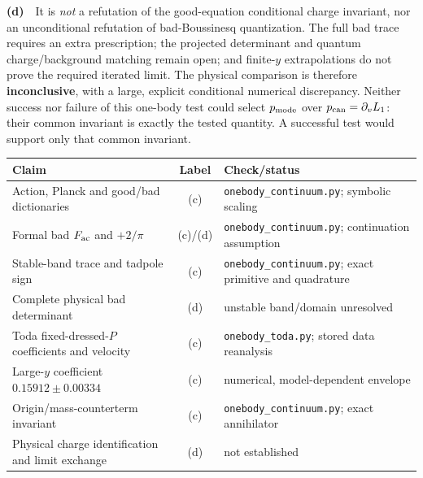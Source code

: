 \documentclass[11pt,a4paper]{article}
\newcommand{\Ld}{\textbf{(d)}\ }
\newcommand{\CC}{\texttt{onebody\_\allowbreak continuum.py}}
\newcommand{\TT}{\texttt{onebody\_\allowbreak toda.py}}
\begin{document}
\Ld\ It is \emph{not} a refutation of the good-equation conditional
charge invariant, nor an unconditional refutation of bad-Boussinesq
quantization. The full bad trace requires an extra prescription; the
projected determinant and quantum charge/background matching remain open;
and finite-$y$ extrapolations do not prove the required iterated limit.
The physical comparison is therefore \textbf{inconclusive}, with a large,
explicit conditional numerical discrepancy. Neither success nor failure
of this one-body test could select $p_{\rm mode}$ over
$p_{\rm can}=\partial_v L_1$: their common invariant is exactly the tested
quantity. A successful test would support only that common invariant.

\begin{center}\small
\begin{tabular}{p{.47\linewidth}cp{.33\linewidth}}
\toprule Claim & Label & Check/status\\\midrule
Action, Planck and good/bad dictionaries & (c) & \CC; symbolic scaling\\
Formal bad $F_{\rm ac}$ and $+2/\pi$ & (c)/(d) & \CC; continuation assumption\\
Stable-band trace and tadpole sign & (c) & \CC; exact primitive and quadrature\\
Complete physical bad determinant & (d) & unstable band/domain unresolved\\
Toda fixed-dressed-$P$ coefficients and velocity & (c) & \TT; stored data reanalysis\\
Large-$y$ coefficient $0.15912\pm0.00334$ & (c) & numerical, model-dependent envelope\\
Origin/mass-counterterm invariant & (c) & \CC; exact annihilator\\
Physical charge identification and limit exchange & (d) & not established\\
\bottomrule
\end{tabular}
\end{center}
\end{document}
